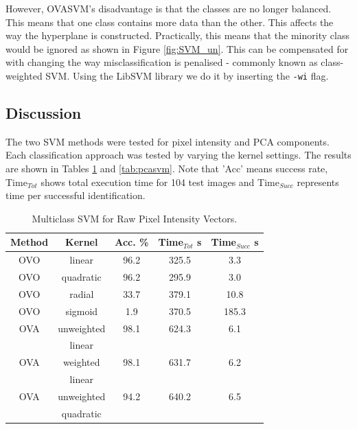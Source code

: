 \documentclass[10pt,twocolumn,letterpaper]{article}
\begin{document}
However, OVASVM's disadvantage is that the classes are no longer balanced. This means that one class contains more data than the other. This affects the way the hyperplane is constructed. Practically, this means that the minority class would be ignored as shown in Figure \ref{fig:SVM_un}. This can be compensated for with changing the way misclassification is penalised - commonly known as class-weighted SVM. Using the LibSVM library we do it by inserting the {\tt\small -wi} flag.


\subsection{Discussion}

The two SVM methods were tested for pixel intensity and PCA components. Each classification approach was tested by varying the kernel settings. The results are shown in Tables \ref{tab:rawsvm} and \ref{tab:pcasvm}. Note that 'Acc' means success rate, Time$_{Tot}$ shows total execution time for 104 test images and Time$_{Succ}$ represents time per successful identification.

\begin{table}[H]
\begin{center}
\caption{Multiclass SVM for Raw Pixel Intensity Vectors.} \label{tab:rawsvm}
\small
\begin{tabular}{||c c c c c||}
\hline
\bf Method & \bf Kernel & \bf Acc. \% & \bf Time$_{Tot}$ s & \bf Time$_{Succ}$ s\\ [0.5ex]
\hline \hline
OVO & linear & 96.2 & 325.5 & 3.3\\ [0.5ex]
\hline
OVO & quadratic & 96.2 & 295.9 & 3.0\\ [0.5ex]
\hline
OVO & radial & 33.7 & 379.1 & 10.8\\ [0.5ex]
\hline
OVO & sigmoid & 1.9 & 370.5 & 185.3\\ [0.5ex]
\hline \hline
OVA & unweighted & 98.1 & 624.3 & 6.1\\ [0.5ex]
& linear & & &\\ [0.5ex]
\hline
OVA & weighted & 98.1 & 631.7 & 6.2\\ [0.5ex]
 & linear & & & \\ [0.5ex]
\hline
OVA & unweighted & 94.2 & 640.2 & 6.5\\ [0.5ex]
 & quadratic & & &\\ [0.5ex]
\hline
\end{tabular}
\end{center}
\end{table}
\end{document}
